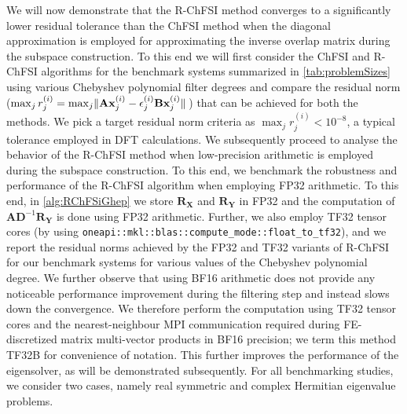 \documentclass[preprint,3p,number,sort&compress]{elsarticle}
\newcommand{\bx}{\textbf{x}}
\newcommand{\bA}{\textbf{A}}
\newcommand{\bB}{\textbf{B}}
\newcommand{\bD}{\textbf{D}}
\newcommand{\bX}{\textbf{X}}
\newcommand{\bY}{\textbf{Y}}
\newcommand{\bR}{\textbf{R}}
\DeclarePairedDelimiter\norm{\lVert}{\rVert\,}%
\begin{document}
We will now demonstrate that the R-ChFSI method converges to a significantly lower residual tolerance than the ChFSI method when the diagonal approximation is employed for approximating the inverse overlap matrix during the subspace construction. To this end we will first consider the ChFSI and R-ChFSI algorithms for the benchmark systems summarized in \cref{tab:problemSizes} using various Chebyshev polynomial filter degrees and compare the residual norm ($\max_j r_j^{(i)}=\max_j\norm{\bA\bx_j^{(i)}-\epsilon_j^{(i)}\bB\bx_j^{(i)}}$) that can be achieved for both the methods. We pick a target residual norm criteria as $\max_j r_j^{(i)}<10^{-8}$, a typical tolerance employed in DFT calculations. We subsequently proceed to analyse the behavior of the R-ChFSI method when low-precision arithmetic is employed during the subspace construction. To this end, we benchmark the robustness and performance of the R-ChFSI algorithm when employing FP32 arithmetic. To this end, in \cref{alg:RChFSiGhep} we store $\bR_{\bX}$ and $\bR_{\bY}$ in FP32 and the computation of $\bA\bD^{-1}\bR_{\bY}$ is done using FP32 arithmetic. Further, we also employ TF32 tensor cores (by using \texttt{oneapi::mkl::blas::compute\_mode::float\_to\_tf32}), and we report the residual norms achieved by the FP32 and TF32 variants of R-ChFSI for our benchmark systems for various values of the Chebyshev polynomial degree. We further observe that using BF16 arithmetic does not provide any noticeable performance improvement during the filtering step and instead slows down the convergence. We therefore perform the computation using TF32 tensor cores and the nearest-neighbour MPI communication required during FE-discretized matrix multi-vector products in BF16 precision; we term this method TF32B for convenience of notation. This further improves the performance of the eigensolver, as will be demonstrated subsequently. For all benchmarking studies, we consider two cases, namely real symmetric and complex Hermitian eigenvalue problems.
\end{document}
